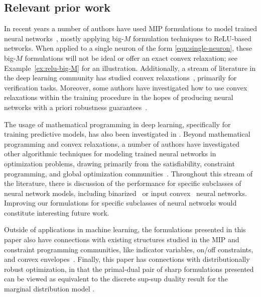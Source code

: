 \documentclass[smallextended]{svjour3}
\newcommand{\blue}[1]{{#1}}
\begin{document}
\subsection{Relevant prior work}\label{sec:lit-review}

In recent years a number of authors have used MIP formulations to model trained neural networks~\cite{Bunel:2017,Cheng:2017,Dutta:2017,Fischetti:2018,Huchette:2018,Kumar:2019,Lomuscio:2017,Say:2017,Serra:2018a,Serra:2018,Tjeng:2017,Wu:2017,Xiao:2018}, mostly applying big-$M$ formulation techniques to ReLU-based networks.
When applied to a single neuron of the form \eqref{eqn:single-neuron}, these big-$M$ formulations will not be ideal or offer an exact convex relaxation; see Example~\ref{ex:relu-big-M} for an illustration. Additionally, a stream of literature in the deep learning community has studied convex relaxations~\cite{Bastani:2016,Dvijotham:2018a,Ehlers:2017,Raghunathan:2018,Salman:2019}, primarily for verification tasks.
Moreover, some authors have investigated how to use convex relaxations within the training procedure in the hopes of producing neural networks with a priori robustness guarantees~\cite{Dvijotham:2018,Wong:2017,Wong:2018}.

\blue{The usage of mathematical programming in deep learning, specifically for training predictive models, has also been investigated in \cite{bienstock2018principled}.}
Beyond \blue{mathematical programming} and convex relaxations, a number of authors have investigated other algorithmic techniques for modeling trained neural networks in optimization problems, drawing primarily from the satisfiability, constraint programming, and global optimization communities~\cite{Bartolini:2011,Bartolini:2012,Katz:2017,Lombardi:2016,Schweidtmann:2018}.
\blue{Throughout this stream of the literature, there is discussion of the performance for specific subclasses of neural network models, including}
 binarized~\cite{Khalil:2018} or input convex~\cite{Amos:2017} neural networks.
\blue{Improving our formulations for specific subclasses of neural networks would constitute interesting future work.}

\blue{Outside of applications in machine learning}, the formulations presented in this paper also have connections with existing structures studied in the MIP and constraint programming communities, like indicator variables, on/off constraints, and convex envelopes~\cite{Atamturk:2018,Belotti:2015,Bonami:2015,Hijazi:2011,Hijazi:2014,Tawarmalani:2002}.
\blue{Finally, this paper has connections with distributionally robust optimization, in that the primal-dual pair of sharp formulations presented can be viewed as equivalent to the discrete sup-sup duality result \cite{chen2018distributionally} for the marginal distribution model \cite{haneveld1986robustness,natarajan2009persistency,Weiss}.}
\end{document}
